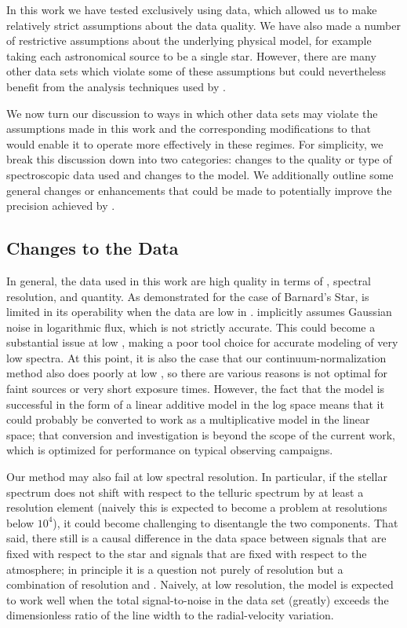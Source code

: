 \documentclass[twocolumn]{aastex62}
\newcommand{\Mdwarf}{Barnard's Star\xspace} %
\begin{document}
In this work we have tested \wobble exclusively using \HARPS data, which allowed us to make relatively strict assumptions about the data quality. 
We have also made a number of restrictive assumptions about the underlying physical model, for example taking each astronomical source to be a single star. 
However, there are many other \EPRV data sets which violate some of these assumptions but could nevertheless benefit from the analysis techniques used by \wobble.
 
We now turn our discussion to ways in which other data sets may violate the assumptions made in this work and the corresponding modifications to \wobble that would enable it to operate more effectively in these regimes. 
For simplicity, we break this discussion down into two categories: changes to the quality or type of spectroscopic data used and changes to the model. 
We additionally outline some general changes or enhancements that could be made to potentially improve the \RV precision achieved by \wobble. 

\subsection{Changes to the Data}
\label{s:data-changes}

In general, the data used in this work are high quality in terms of \SNR, spectral resolution, and quantity. 
As demonstrated for the case of \Mdwarf, \wobble is limited in its operability when the data are low in \SNR. 
\wobble implicitly assumes Gaussian noise in logarithmic flux, which is not strictly accurate. 
This could become a substantial issue at low \SNR, making \wobble a poor tool choice for accurate modeling of very low \SNR spectra.
At this point, it is also the case that our continuum-normalization method also does poorly at low \SNR, so there are various reasons \wobble is not optimal for faint sources or very short exposure times.
However, the fact that the model is successful in the form of a linear additive model in the log space means that it could probably be converted to work as a multiplicative model in the linear space; that conversion and investigation is beyond the scope of the current work, which is optimized for performance on typical \HARPS observing campaigns.

Our method may also fail at low spectral resolution. 
In particular, if the stellar spectrum does not shift with respect to the telluric spectrum by at least a resolution element (naively this is expected to become a problem at resolutions below $10^4$), it could become challenging to disentangle the two components.
That said, there still is a causal difference in the data space between signals that are fixed with respect to the star and signals that are fixed with respect to the atmosphere; in principle it is a question not purely of resolution but a combination of resolution and \SNR.
Naively, at low resolution, the model is expected to work well when the total signal-to-noise in the data set (greatly) exceeds the dimensionless ratio of the line width to the radial-velocity variation.
\end{document}
